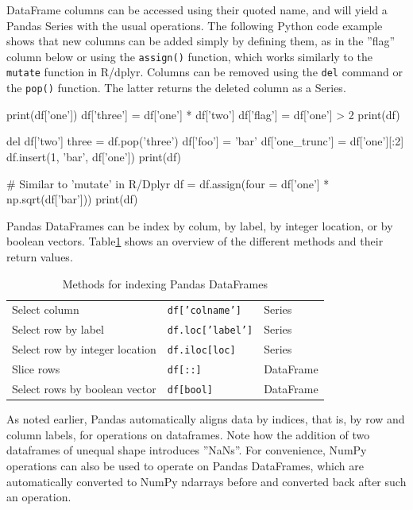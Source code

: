 DataFrame columns can be accessed using their quoted name, and will yield a Pandas Series with the usual operations. The following Python code example shows that new columns can be added simply by defining them, as in the ''flag'' column below or using the \texttt{assign()} function, which works similarly to the \texttt{mutate} function in R/dplyr. Columns can be removed using the \texttt{del} command or the \texttt{pop()} function. The latter returns the deleted column as a Series.

\begin{samepage}
\begin{pythoncode}
print(df['one'])
df['three'] = df['one'] * df['two']
df['flag'] = df['one'] > 2
print(df)

del df['two']
three = df.pop('three')
df['foo'] = 'bar'
df['one_trunc'] = df['one'][:2]
df.insert(1, 'bar', df['one'])
print(df)

# Similar to 'mutate' in R/Dplyr 
df = df.assign(four = df['one'] * np.sqrt(df['bar']))
print(df)
\end{pythoncode}
\end{samepage}

Pandas DataFrames can be index by colum, by label, by integer location, or by boolean vectors. Table\ref{tab:pandasindexing} shows an overview of the different methods and their return values.

\begin{table}[h]
\centering
\renewcommand{\arraystretch}{1.25}
\begin{tabular}{l|l|l} \hline
Select column & \texttt{df['colname']} & Series \\
Select row by label & \texttt{df.loc['label']}  & Series \\
Select row by integer location & \texttt{df.iloc[loc]} & Series \\
Slice rows & \texttt{df[::]} & DataFrame \\
Select rows by boolean vector & \texttt{df[bool]} & DataFrame \\ \hline
\end{tabular}
\caption{Methods for indexing Pandas DataFrames}
\label{tab:pandasindexing}
\end{table}

As noted earlier, Pandas automatically aligns data by indices, that is, by row and column labels, for operations on dataframes. Note how the addition of two dataframes of unequal shape introduces ''NaNs''. For convenience, NumPy operations can also be used to operate on Pandas DataFrames, which are automatically converted to NumPy ndarrays before and converted back after such an operation. 

